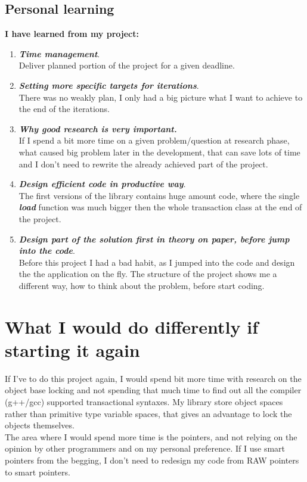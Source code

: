 \documentclass[12pt]{article}
\begin{document}
\subsection{Personal learning}
\textbf{I have learned from my project:}
\begin{enumerate}
\item \textit{\textbf{Time management}}.\\
Deliver planned portion of the project for a given deadline. 
\item \textit{\textbf{Setting more specific targets for iterations}}.\\
There was no weakly plan, I only had a big picture what I want to achieve to the end of the iterations. 
\item \textit{\textbf{Why good research is very important.}}\\
If I spend a bit more time on a given problem/question at research phase, what caused big problem later in the development, that can save lots of time and I don't need to rewrite the already achieved part of the project. 
\item \textit{\textbf{Design efficient code in productive way}}.\\
The first versions of the library contains huge amount code, where the single \textit{\textbf{load}} function was much bigger then the whole transaction class at the end of the project.
\item \textit{\textbf{Design part of the solution first in theory on paper, before jump into the code}}.\\
Before this project I had a bad habit, as I jumped into the code and design the the application on the fly. The structure of the project shows me a different way, how to think about the problem, before start coding.      
\end{enumerate}

\section{What I would do differently if starting it again}
If I've to do this project again, I would spend bit more time with research on the object base locking and not spending that much time to find out all the compiler (g++/gcc) supported transactional syntaxes. My library store object spaces rather than primitive type variable spaces, that gives an advantage to lock the objects themselves.\\

The area where I would spend more time is the pointers, and not relying on the opinion by other programmers and on my personal preference. If I use smart pointers from the begging, I don't need to redesign my code from RAW pointers to smart pointers.\\
\end{document}
